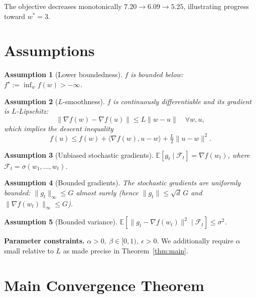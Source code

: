 \documentclass[11pt]{article}
\newtheorem{assumption}{Assumption}
\begin{document}
The objective decreases monotonically
$7.20 \to 6.09 \to 5.25$, illustrating progress toward $w^*=3$.

\section*{Assumptions}

\begin{assumption}[Lower boundedness]\label{as:lb}
$f$ is bounded below: $f^\star := \inf_{w} f(w) > -\infty$.
\end{assumption}

\begin{assumption}[$L$-smoothness]\label{as:smooth}
$f$ is continuously differentiable and its gradient is $L$-Lipschitz:
\[
\|\nabla f(w)-\nabla f(u)\| \le L\|w-u\|\quad\forall w,u,
\]
which implies the descent inequality
\[
f(u) \le f(w) + \langle \nabla f(w), u-w\rangle + \tfrac{L}{2}\|u-w\|^2.
\]
\end{assumption}

\begin{assumption}[Unbiased stochastic gradients]\label{as:unbiased}
$\mathbb{E}[g_t \mid \mathcal{F}_t] = \nabla f(w_t)$, where
$\mathcal{F}_t = \sigma(w_1,\dots,w_t)$.
\end{assumption}

\begin{assumption}[Bounded gradients]\label{as:bound}
The stochastic gradients are uniformly bounded:
$\|g_t\|_\infty \le G$ almost surely (hence $\|g_t\| \le \sqrt{d}\,G$ and
$\|\nabla f(w_t)\|_\infty \le G$).
\end{assumption}

\begin{assumption}[Bounded variance]\label{as:var}
$\mathbb{E}[\|g_t-\nabla f(w_t)\|^2 \mid \mathcal{F}_t] \le \sigma^2$.
\end{assumption}

\noindent\textbf{Parameter constraints.}
$\alpha>0,\ \beta\in[0,1),\ \epsilon>0$. We additionally require
$\alpha$ small relative to $L$ as made precise in
Theorem~\ref{thm:main}.

\section*{Main Convergence Theorem}
\end{document}
